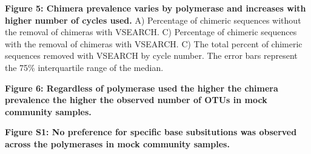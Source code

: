 \documentclass[11pt,]{article}
\begin{document}
\textbf{Figure 5: Chimera prevalence varies by polymerase and increases
with higher number of cycles used.} A) Percentage of chimeric sequences
without the removal of chimeras with VSEARCH. C) Percentage of chimeric
sequences with the removal of chimeras with VSEARCH. C) The total
percent of chimeric sequences removed with VSEARCH by cycle number. The
error bars represent the 75\% interquartile range of the median.

\textbf{Figure 6: Regardless of polymerase used the higher the chimera
prevalence the higher the observed number of OTUs in mock community
samples.}

\newpage

\textbf{Figure S1: No preference for specific base subsitutions was
observed across the polymerases in mock community samples.}
\end{document}
